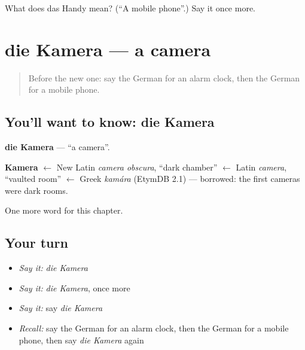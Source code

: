\begin{tcolorbox}[breakable,colback=teal!4,colframe=teal!35!black,title={Before you move on}]
What does das Handy mean? (\textquotedblleft{}A mobile phone\textquotedblright{}.) Say it once more.
\end{tcolorbox}
\section[die Kamera]{die Kamera — a camera}

\label{lesson:GE-C116-kamera}



\begin{quote}
Before the new one: say the German for an alarm clock, then the German for a mobile phone.
\end{quote}

\subsection*{You'll want to know: die Kamera}
\textbf{die Kamera} — \textquotedblleft{}a camera\textquotedblright{}.

\begin{cousinweb}
\textbf{Kamera} $\leftarrow$ New Latin \emph{camera obscura}, \textquotedblleft{}dark chamber\textquotedblright{} $\leftarrow$ Latin \emph{camera}, \textquotedblleft{}vaulted room\textquotedblright{} $\leftarrow$ Greek \emph{kamára} (EtymDB 2.1) — borrowed: the first cameras were dark rooms.
\end{cousinweb}

\begin{grammarlens}[title={What you've built}]
One more word for this chapter.
\end{grammarlens}

\subsection*{Your turn}
\begin{itemize}
\raggedright
  \item \emph{Say it:} \emph{die Kamera}
  \item \emph{Say it:} \emph{die Kamera}, once more
  \item \emph{Say it:} say \emph{die Kamera}
  \item \emph{Recall:} say the German for an alarm clock, then the German for a mobile phone, then say \emph{die Kamera} again
\end{itemize}

